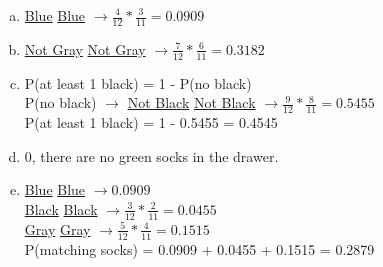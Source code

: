 {
\begin{enumerate}[(a)]
\setlength{\itemsep}{0mm}
\item \underline{Blue} \underline{Blue} $\rightarrow \frac{4}{12} * \frac{3}{11} = 0.0909$
\item \underline{Not Gray} \underline{Not Gray} $\rightarrow \frac{7}{12} * \frac{6}{11} = 0.3182$
\item P(at least 1 black) = 1 - P(no black) \\
P(no black) $\rightarrow$  \underline{Not Black} \underline{Not Black} $\rightarrow \frac{9}{12} * \frac{8}{11} = 0.5455$ \\
P(at least 1 black) = 1 - 0.5455 = 0.4545
\item 0, there are no green socks in the drawer.
\item \underline{Blue} \underline{Blue} $\rightarrow 0.0909$ \\
\underline{Black} \underline{Black} $\rightarrow \frac{3}{12} * \frac{2}{11} = 0.0455$ \\
\underline{Gray} \underline{Gray} $\rightarrow \frac{5}{12} * \frac{4}{11} = 0.1515$ \\
P(matching socks) = 0.0909 + 0.0455 + 0.1515 = 0.2879
\end{enumerate}
}


